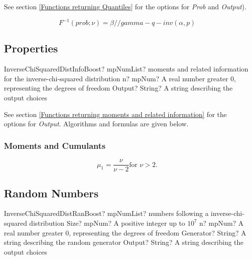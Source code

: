 See section \ref{Functions returning Quantiles} for the options for  {\itshape\sffamily Prob} and {\itshape\sffamily Output}). 

\begin{equation} 
	F^{-1}(prob;\nu)= \beta / / gamma-q-inv(\alpha, p)
\end{equation}


\subsection{Properties}
\label{InverseChiSquaredDistributionProperties}


\begin{mpFunctionsExtract}
	\mpFunctionTwoNotImplemented
	{InverseChiSquaredDistInfoBoost? mpNumList? moments and related information for the inverse-chi-squared distribution}
	{n? mpNum? A real number greater 0, representing the degrees of freedom}
	{Output? String? A string describing the output choices}
\end{mpFunctionsExtract}

\vspace{0.3cm}

See section \ref{Functions returning moments and related information} for the options for {\itshape\sffamily Output}. Algorithms and formulas are given below.

\subsubsection{Moments and Cumulants}
\begin{equation} 
	\mu_1 = \frac{\nu}{\nu-2} \text{for } \nu>2.
\end{equation}



\subsection{Random Numbers}

\begin{mpFunctionsExtract}
	\mpFunctionFourNotImplemented
	{InverseChiSquaredDistRanBoost? mpNumList? numbers following a inverse-chi-squared distribution}
	{Size? mpNum? A positive integer up to $10^7$}
	{n? mpNum? A real number greater 0, representing the degrees of freedom}
	{Generator? String? A string describing the random generator}
	{Output? String? A string describing the output choices}
\end{mpFunctionsExtract}


